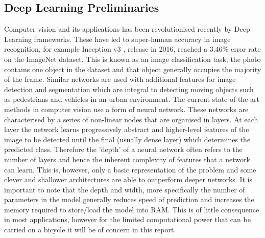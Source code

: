 \documentclass[a4paper,11pt,notitlepage]{article}
\begin{document}
\subsection{Deep Learning Preliminaries} \label{dlp}
Computer vision and its applications has been revolutionised recently by Deep Learning frameworks. These have led to super-human accuracy in image recognition, for example Inception v3 \cite{Szegedy_2016_CVPR}, release in 2016, reached a 3.46\% error rate on the ImageNet \cite{ILSVRC15} dataset. This is known as an image classification task; the photo contains one object in the dataset and that object generally occupies the majority of the frame. Similar networks are used with additional features for image detection and segmentation which are integral to detecting moving objects such as pedestrians and vehicles in an urban environment.
\newline\newline
The current state-of-the-art methods in computer vision use a form of neural network. These networks are characterised by a series of non-linear nodes that are organised in layers. At each layer the network learns progressively abstract and higher-level features of the image to be detected until the final (usually dense layer) which determines the predicted class. Therefore the 'depth' of a neural network often refers to the number of layers and hence the inherent complexity of features that a network can learn. This is, however, only a basic representation of the problem and some clever and shallower architectures are able to outperform deeper networks. It is important to note that the depth and width, more specifically the number of parameters in the model generally reduces speed of prediction and increases the memory required to store/load the model into RAM. This is of little consequence in most applications, however for the limited computational power that can be carried on a bicycle it will be of concern in this report.
\end{document}
